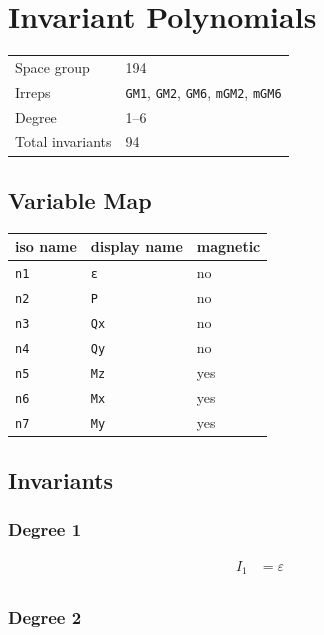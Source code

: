 \documentclass{article}
\begin{document}
\section*{Invariant Polynomials}

\begin{tabular}{ll}
\toprule
Space group & 194 \\
Irreps & \texttt{GM1\textplus{}}, \texttt{GM2\textminus{}}, \texttt{GM6\textminus{}}, \texttt{mGM2\textplus{}}, \texttt{mGM6\textplus{}} \\
Degree & 1--6 \\
Total invariants & 94 \\
\bottomrule
\end{tabular}

\subsection*{Variable Map}

\begin{tabular}{lll}
\toprule
iso name & display name & magnetic \\
\midrule
\texttt{n1} & \texttt{ε} & no \\
\texttt{n2} & \texttt{P} & no \\
\texttt{n3} & \texttt{Qx} & no \\
\texttt{n4} & \texttt{Qy} & no \\
\texttt{n5} & \texttt{Mz} & yes \\
\texttt{n6} & \texttt{Mx} & yes \\
\texttt{n7} & \texttt{My} & yes \\
\bottomrule
\end{tabular}

\subsection*{Invariants}

\subsubsection*{Degree 1}

\begin{align*}
I_{1} &= ε \\
\end{align*}

\subsubsection*{Degree 2}
\end{document}
